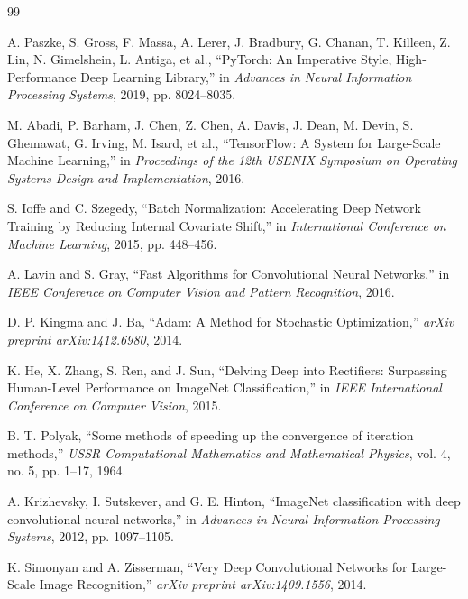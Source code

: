 \documentclass[12pt,oneside,a4paper]{report}
\begin{document}
\begin{thebibliography}{99}

 A. Paszke, S. Gross, F. Massa, A. Lerer, J. Bradbury, G. Chanan, T. Killeen, Z. Lin, N. Gimelshein, L. Antiga, et al., ``PyTorch: An Imperative Style, High-Performance Deep Learning Library,'' in \textit{Advances in Neural Information Processing Systems}, 2019, pp. 8024--8035.

 M. Abadi, P. Barham, J. Chen, Z. Chen, A. Davis, J. Dean, M. Devin, S. Ghemawat, G. Irving, M. Isard, et al., ``TensorFlow: A System for Large-Scale Machine Learning,'' in \textit{Proceedings of the 12th USENIX Symposium on Operating Systems Design and Implementation}, 2016.

 S. Ioffe and C. Szegedy, ``Batch Normalization: Accelerating Deep Network Training by Reducing Internal Covariate Shift,'' in \textit{International Conference on Machine Learning}, 2015, pp. 448--456.

 A. Lavin and S. Gray, ``Fast Algorithms for Convolutional Neural Networks,'' in \textit{IEEE Conference on Computer Vision and Pattern Recognition}, 2016.

 D. P. Kingma and J. Ba, ``Adam: A Method for Stochastic Optimization,'' \textit{arXiv preprint arXiv:1412.6980}, 2014.

 K. He, X. Zhang, S. Ren, and J. Sun, ``Delving Deep into Rectifiers: Surpassing Human-Level Performance on ImageNet Classification,'' in \textit{IEEE International Conference on Computer Vision}, 2015.

 B. T. Polyak, ``Some methods of speeding up the convergence of iteration methods,'' \textit{USSR Computational Mathematics and Mathematical Physics}, vol. 4, no. 5, pp. 1--17, 1964.

 A. Krizhevsky, I. Sutskever, and G. E. Hinton, ``ImageNet classification with deep convolutional neural networks,'' in \textit{Advances in Neural Information Processing Systems}, 2012, pp. 1097--1105.

 K. Simonyan and A. Zisserman, ``Very Deep Convolutional Networks for Large-Scale Image Recognition,'' \textit{arXiv preprint arXiv:1409.1556}, 2014.


\end{thebibliography}
\end{document}
